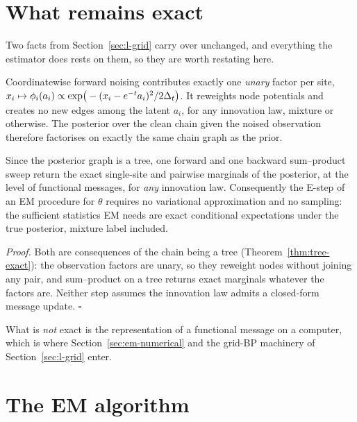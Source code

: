 \section{What remains exact}\label{sec:em-exact}

Two facts from Section~\ref{sec:l-grid} carry over unchanged, and everything
the estimator does rests on them, so they are worth restating here.

\begin{proposition}
\label{prop:em-unary}
Coordinatewise forward noising contributes exactly one \emph{unary} factor per
site, $x_i \mapsto \phi_i(a_i) \propto \exp\!\big(-(x_i-e^{-t}a_i)^2/2\Delta_t\big)$.
It reweights node potentials and creates no new edges among the latent
$a_i$, for any innovation law, mixture or otherwise. The posterior over the
clean chain given the noised observation therefore factorises on exactly the
same chain graph as the prior.
\end{proposition}

\begin{proposition}\label{prop:em-estep}
Since the posterior graph is a tree, one forward and one backward
sum--product sweep return the exact single-site and pairwise marginals of the
posterior, at the level of functional messages, for \emph{any} innovation
law. Consequently the E-step of an EM procedure for $\theta$ requires no
variational approximation and no sampling: the sufficient statistics EM needs
are exact conditional expectations under the true posterior, mixture label
included.
\end{proposition}

\emph{Proof.} Both are consequences of the chain being a tree
(Theorem~\ref{thm:tree-exact}): the observation factors are unary, so they
reweight nodes without joining any pair, and sum--product on a tree returns
exact marginals whatever the factors are. Neither step assumes the innovation
law admits a closed-form message update. \hfill$\square$

 What is \emph{not} exact is the representation of a functional
message on a computer, which is where Section~\ref{sec:em-numerical} and the
grid-BP machinery of Section~\ref{sec:l-grid} enter.

\section{The EM algorithm}\label{sec:em-algorithm}

